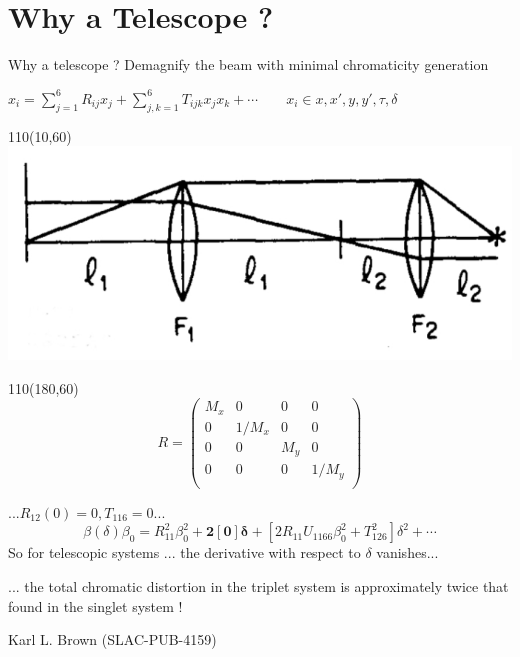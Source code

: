 \documentclass{beamer}
\begin{document}
\section{Why a Telescope ?}
\begin{frame}{Why a telescope ?}
Demagnify the beam with minimal chromaticity generation\par
$x_i=\sum_{j=1}^6R_{ij}x_j+\sum_{j,k=1}^6T_{ijk}x_jx_k+\cdots\qquad x_i\in x,x',y,y',\tau,\delta$\par
\setlength{\TPHorizModule}{1pt}
  \setlength{\TPVertModule}{1pt}
 \begin{textblock}{110}(10,60)
\includegraphics[scale=0.3]{telescope.jpg}
\end{textblock}
\begin{textblock}{110}(180,60)
\begin{equation*}
R=
 \begin{pmatrix}
   M_x & 0 & 0 & 0 \\
   0 & 1/M_x & 0 & 0 \\
   0 & 0 & M_y & 0 \\
   0 & 0 & 0 & 1/M_y \\
  \end{pmatrix}
\end{equation*}
\end{textblock}
\vspace*{2.6cm}
\begin{tcolorbox}[colback=green!5,colframe=green!40!black,title=A Conceptual Design of Final Focus Systems for Linear Colliders]
...$R_{12}(0)=0, T_{116}=0$... 
\begin{equation*}
\beta(\delta)\beta_0 = R_{11}^2\beta_0^2+\boldsymbol{2[0]\delta}+[2R_{11}U_{1166}\beta_0^2+T_{126}^2]\delta^2+\cdots
\end{equation*}
So for telescopic systems ... the derivative with respect to $\delta$ vanishes...\par
... the total chromatic distortion in the triplet system is approximately twice that found in the singlet system !
\end{tcolorbox}
Karl L. Brown (SLAC-PUB-4159)
\end{frame}
\end{document}
